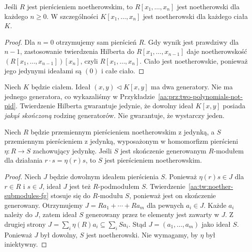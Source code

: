 \begin{wniosek}
\label{aa:wn:hilbert-finite-vars}
Jeśli $R$ jest pierścieniem noetherowskim, to
$R[x_1,\ldots,x_n]$ jest noetherowski dla każdego
$n\ge0$. W szczególności $K[x_1,\ldots,x_n]$
jest noetherowski dla każdego ciała $K$.
\end{wniosek}
\begin{proof}
Dla $n=0$ otrzymujemy sam pierścień $R$.
Gdy wynik jest prawdziwy dla $n-1$, zastosowanie
twierdzenia Hilberta do
$R[x_1,\ldots,x_{n-1}]$ daje noetherowskość
$(R[x_1,\ldots,x_{n-1}])[x_n]$, czyli
$R[x_1,\ldots,x_n]$. Ciało jest noetherowskie,
ponieważ jego jedynymi ideałami są $(0)$ i całe ciało.
\end{proof}

\begin{przyklad}
\label{aa:prz:hilbert-not-pid}
Niech $K$ będzie ciałem. Ideał $(x,y)\triangleleft K[x,y]$ ma dwa generatory.
Nie ma jednego generatora, co wykazaliśmy w
Przykładzie~\ref{aa:prz:two-polynomials-not-pid}.
Twierdzenie Hilberta gwarantuje jedynie, że dowolny
ideał $K[x,y]$ posiada \emph{jakąś skończoną}
rodzinę generatorów. Nie gwarantuje, że wystarczy jeden.
\end{przyklad}


\begin{twierdzenie}
\label{aa:tw:noether-module-finite-algebra}
Niech $R$ będzie przemiennym pierścieniem noetherowskim
z jedynką, a $S$ przemiennym pierścieniem z jedynką,
wyposażonym w homomorfizm pierścieni
$\eta:R\to S$ zachowujący jedynkę. Jeśli $S$ jest
skończenie generowanym $R$-modułem dla działania
$r\cdot s=\eta(r)s$, to $S$ jest pierścieniem
noetherowskim.
\end{twierdzenie}
\begin{proof}
Niech $J$ będzie dowolnym ideałem pierścienia $S$.
Ponieważ $\eta(r)s\in J$ dla $r\in R$ i $s\in J$,
ideał $J$ jest też $R$-podmodułem $S$.
Twierdzenie~\ref{aa:tw:noether-submodules-fg}
stosuje się do $R$-modułu $S$, ponieważ jest on
skończenie generowany. Otrzymujemy
$J=Ra_1+\cdots+Ra_m$ dla pewnych $a_i\in J$.
Każde $a_i$ należy do $J$, zatem ideał $S$
generowany przez te elementy jest zawarty w $J$.
Z drugiej strony
$J=\sum_i\eta(R)a_i\subseteq\sum_i Sa_i$.
Stąd $J=(a_1,\ldots,a_m)$ jako ideał $S$.
Ponieważ $J$ był dowolny, $S$ jest noetherowski.
Nie wymagamy, by $\eta$ był iniektywny.
\end{proof}

